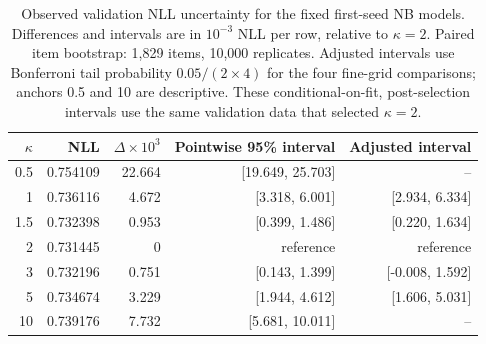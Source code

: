 \begin{table}[t]
\centering\small
\caption{Observed validation NLL uncertainty for the fixed first-seed NB models. Differences and intervals are in $10^{-3}$ NLL per row, relative to $\kappa=2$. Paired item bootstrap: 1,829 items, 10,000 replicates. Adjusted intervals use Bonferroni tail probability $0.05/(2\times4)$ for the four fine-grid comparisons; anchors 0.5 and 10 are descriptive. These conditional-on-fit, post-selection intervals use the same validation data that selected $\kappa=2$.}
\label{tab:nb-nll-uncertainty}
\begin{tabular}{rrrrr}\toprule
$\kappa$ & NLL & $\Delta\times10^3$ & Pointwise 95\% interval & Adjusted interval \\ \midrule
0.5 & 0.754109 & 22.664 & [19.649, 25.703] & -- \\
1 & 0.736116 & 4.672 & [3.318, 6.001] & [2.934, 6.334] \\
1.5 & 0.732398 & 0.953 & [0.399, 1.486] & [0.220, 1.634] \\
2 & 0.731445 & 0 & reference & reference \\
3 & 0.732196 & 0.751 & [0.143, 1.399] & [-0.008, 1.592] \\
5 & 0.734674 & 3.229 & [1.944, 4.612] & [1.606, 5.031] \\
10 & 0.739176 & 7.732 & [5.681, 10.011] & -- \\
\bottomrule\end{tabular}
\end{table}
